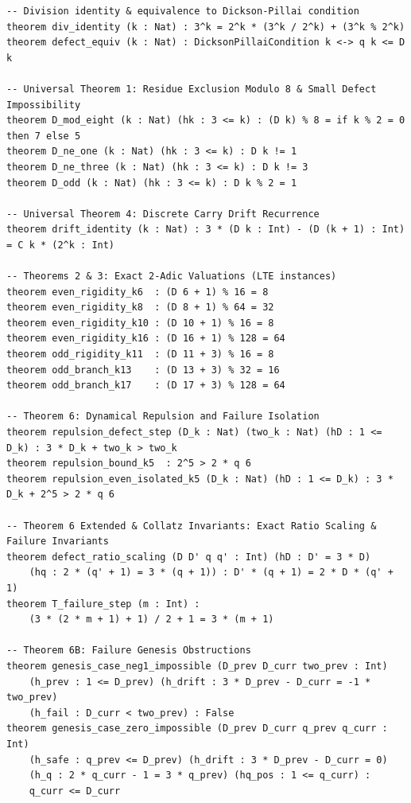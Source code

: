 \documentclass[11pt,reqno]{amsart}
\theoremstyle{definition}
\numberwithin{equation}{section}
\begin{document}
\begin{tiny}
\begin{verbatim}
-- Division identity & equivalence to Dickson-Pillai condition
theorem div_identity (k : Nat) : 3^k = 2^k * (3^k / 2^k) + (3^k % 2^k)
theorem defect_equiv (k : Nat) : DicksonPillaiCondition k <-> q k <= D k

-- Universal Theorem 1: Residue Exclusion Modulo 8 & Small Defect Impossibility
theorem D_mod_eight (k : Nat) (hk : 3 <= k) : (D k) % 8 = if k % 2 = 0 then 7 else 5
theorem D_ne_one (k : Nat) (hk : 3 <= k) : D k != 1
theorem D_ne_three (k : Nat) (hk : 3 <= k) : D k != 3
theorem D_odd (k : Nat) (hk : 3 <= k) : D k % 2 = 1

-- Universal Theorem 4: Discrete Carry Drift Recurrence
theorem drift_identity (k : Nat) : 3 * (D k : Int) - (D (k + 1) : Int) = C k * (2^k : Int)

-- Theorems 2 & 3: Exact 2-Adic Valuations (LTE instances)
theorem even_rigidity_k6  : (D 6 + 1) % 16 = 8
theorem even_rigidity_k8  : (D 8 + 1) % 64 = 32
theorem even_rigidity_k10 : (D 10 + 1) % 16 = 8
theorem even_rigidity_k16 : (D 16 + 1) % 128 = 64
theorem odd_rigidity_k11  : (D 11 + 3) % 16 = 8
theorem odd_branch_k13    : (D 13 + 3) % 32 = 16
theorem odd_branch_k17    : (D 17 + 3) % 128 = 64

-- Theorem 6: Dynamical Repulsion and Failure Isolation
theorem repulsion_defect_step (D_k : Nat) (two_k : Nat) (hD : 1 <= D_k) : 3 * D_k + two_k > two_k
theorem repulsion_bound_k5  : 2^5 > 2 * q 6
theorem repulsion_even_isolated_k5 (D_k : Nat) (hD : 1 <= D_k) : 3 * D_k + 2^5 > 2 * q 6

-- Theorem 6 Extended & Collatz Invariants: Exact Ratio Scaling & Failure Invariants
theorem defect_ratio_scaling (D D' q q' : Int) (hD : D' = 3 * D)
    (hq : 2 * (q' + 1) = 3 * (q + 1)) : D' * (q + 1) = 2 * D * (q' + 1)
theorem T_failure_step (m : Int) :
    (3 * (2 * m + 1) + 1) / 2 + 1 = 3 * (m + 1)

-- Theorem 6B: Failure Genesis Obstructions
theorem genesis_case_neg1_impossible (D_prev D_curr two_prev : Int)
    (h_prev : 1 <= D_prev) (h_drift : 3 * D_prev - D_curr = -1 * two_prev)
    (h_fail : D_curr < two_prev) : False
theorem genesis_case_zero_impossible (D_prev D_curr q_prev q_curr : Int)
    (h_safe : q_prev <= D_prev) (h_drift : 3 * D_prev - D_curr = 0)
    (h_q : 2 * q_curr - 1 = 3 * q_prev) (hq_pos : 1 <= q_curr) :
    q_curr <= D_curr


\end{verbatim}
\end{tiny}
\end{document}
